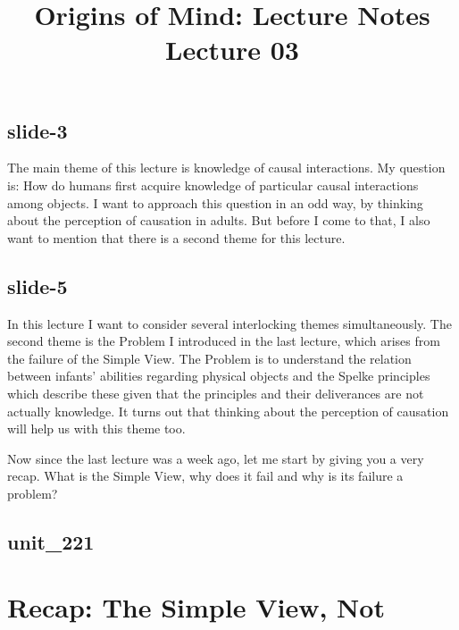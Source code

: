 \documentclass[12pt,\papersize]{extarticle}
\begin{document}
\setlength\footnotesep{1em}







      
\title {Origins of Mind: Lecture Notes \\ Lecture 03}
 
 
 
\maketitle
 
\subsection{slide-3}
The main theme of this lecture is knowledge of causal interactions.
My question is: How do humans first acquire knowledge of particular causal 
interactions among objects.
I want to approach this question in an odd way, by thinking about the perception of causation
in adults.
But before I come to that, I also want to mention that there is a second theme for this lecture.
 
\subsection{slide-5}
In this lecture I want to consider several interlocking themes simultaneously.
The second theme is the Problem I introduced in the last lecture, which arises from
the failure of the Simple View.
The Problem is to understand the relation between infants' abilities regarding physical objects
and the Spelke principles which describe these given that the principles and their deliverances
are not actually knowledge.
It turns out that thinking about the perception of causation will help us with this theme too.
 
Now since the last lecture was a week ago, 
let me start by giving you a very recap.
What is the Simple View, why does it fail and why is its failure a problem?
 
\subsection{unit\_221}
 
 
\section{Recap: The Simple View, Not}
 
\end{document}
